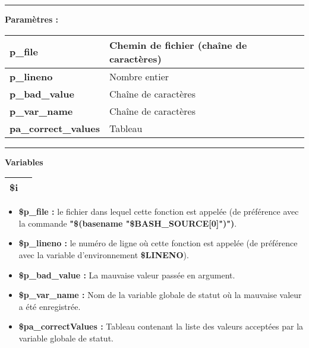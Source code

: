 \documentclass[a4paper,10pt]{article}
\begin{document}

\par\noindent\rule{\textwidth}{0.4pt}

\begin{justify}
    \textbf{Paramètres :}

    \begin{tabular}{|l|l|}
        \hline
        \textbf{\color{vars}p\_file} & Chemin de fichier (chaîne de caractères)\\
        \hline
        \textbf{\color{vars}p\_lineno} & Nombre entier\\
        \hline
        \textbf{\color{vars}p\_bad\_value} & Chaîne de caractères\\
        \hline
        \textbf{\color{vars}p\_var\_name} & Chaîne de caractères\\
        \hline
        \textbf{\color{vars}pa\_correct\_values} & Tableau\\
        \hline
    \end{tabular}
\end{justify}


\par\noindent\rule{\textwidth}{0.4pt}

\begin{justify}
    \textbf{Variables}

    \begin{tabular}{|l|l|}
        \hline
        \textbf{\color{vars}\$i} & \\
        \hline
    \end{tabular}
\end{justify}

\begin{justify}
    \begin{itemize}
        \item \textbf{\color{vars}\$p\_file\color{text} :} le fichier dans lequel cette fonction est appelée (de préférence avec la commande \textbf{\textbf{"\$(\color{gray}basename \color{text}"\color{vars}\$BASH\_SOURCE[0]\color{text}")")}}.\setlength{\parskip}{1em}

        \item \textbf{\color{vars}\$p\_lineno\color{text} :} le numéro de ligne où cette fonction est appelée (de préférence avec la variable d'environnement \textbf{\color{vars}\$LINENO}).

        \item \textbf{\color{vars}\$p\_bad\_value\color{text} :} La mauvaise valeur passée en argument\color{text}.

        \item \textbf{\color{vars}\$p\_var\_name\color{text} :}  Nom de la variable globale de statut où la mauvaise valeur a été enregistrée.\color{text}

        \item \textbf{\color{vars}\$pa\_correctValues\color{text} :} Tableau contenant la liste des valeurs acceptées par la variable globale de statut.
    \end{itemize}
\end{justify}
\end{document}
